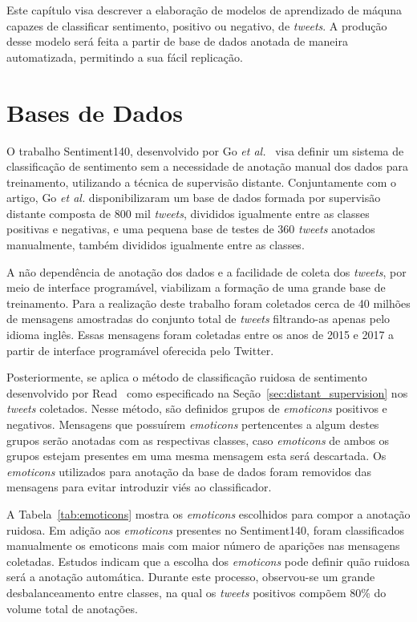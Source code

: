 Este capítulo visa descrever a elaboração de modelos de aprendizado de máquna capazes de classificar sentimento,
positivo ou negativo, de \textit{tweets}.
A produção desse modelo será feita a partir de base de dados anotada de maneira automatizada, permitindo a sua
fácil replicação.

\section{Bases de Dados} \label{sec:data}

O trabalho Sentiment140, desenvolvido por Go \textit{et al.}~\cite{go09} visa definir um sistema de classificação de
sentimento sem a necessidade de anotação manual dos dados para treinamento, utilizando a técnica de supervisão distante.
Conjuntamente com o artigo, Go \textit{et al.} disponibilizaram um base de dados formada por supervisão distante composta
de 800 mil \textit{tweets}, divididos igualmente entre as classes positivas e negativas, e uma pequena base de testes de
360 \textit{tweets} anotados manualmente, também divididos igualmente entre as classes.

A não dependência de anotação dos dados e a facilidade de coleta dos \textit{tweets}, por meio de interface programável,
viabilizam a formação de uma grande base de treinamento.
Para a realização deste trabalho foram coletados cerca de 40 milhões de mensagens amostradas do conjunto total de
\textit{tweets} filtrando-as apenas pelo idioma inglês.
Essas mensagens foram coletadas entre os anos de 2015 e 2017 a partir de interface programável oferecida pelo Twitter.

Posteriormente, se aplica o método de classificação ruidosa de sentimento desenvolvido por Read~\cite{read05} como
especificado na Seção~\ref{sec:distant_supervision} nos \textit{tweets} coletados.
Nesse método, são definidos grupos de \textit{emoticons} positivos e negativos.
Mensagens que possuírem \textit{emoticons} pertencentes a algum destes grupos serão anotadas com as respectivas classes,
caso \textit{emoticons} de ambos os grupos estejam presentes em uma mesma mensagem esta será descartada.
Os \textit{emoticons} utilizados para anotação da base de dados foram removidos das mensagens para evitar introduzir
viés ao classificador.

A Tabela~\ref{tab:emoticons} mostra os \textit{emoticons} escolhidos para compor a anotação ruidosa.
Em adição aos \textit{emoticons} presentes no Sentiment140, foram classificados manualmente os emoticons mais com maior
número de aparições nas mensagens coletadas.
Estudos indicam que a escolha dos \textit{emoticons} pode definir quão ruidosa será a anotação automática.
Durante este processo, observou-se um grande desbalanceamento entre classes, na qual os \textit{tweets} positivos
compõem 80\% do volume total de anotações.

